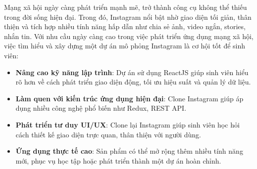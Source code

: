 

\vspace{0.5cm} %

Mạng xã hội ngày càng phát triển mạnh mẽ, trở thành công cụ không thể thiếu trong đời sống hiện đại. Trong đó, Instagram nổi bật nhờ giao diện tối giản, thân thiện và tích hợp nhiều tính năng hấp dẫn như chia sẻ ảnh, video ngắn, stories, nhắn tin. Với nhu cầu ngày càng cao trong việc phát triển ứng dụng mạng xã hội, việc tìm hiểu và xây dựng một dự án mô phỏng Instagram là cơ hội tốt để sinh viên:

\begin{itemize}
    \renewcommand{\labelitemi}{-} %
    \item \textbf{Nâng cao kỹ năng lập trình}: Dự án sử dụng ReactJS giúp sinh viên hiểu rõ hơn về cách phát triển giao diện động, tối ưu hiệu suất và quản lý dữ liệu.
    \item \textbf{Làm quen với kiến trúc ứng dụng hiện đại}: Clone Instagram giúp áp dụng nhiều công nghệ phổ biến như Redux, REST API.
    \item \textbf{Phát triển tư duy UI/UX}: Clone lại Instagram giúp sinh viên học hỏi cách thiết kế giao diện trực quan, thân thiện với người dùng.
    \item \textbf{Ứng dụng thực tế cao}: Sản phẩm có thể mở rộng thêm nhiều tính năng mới, phục vụ học tập hoặc phát triển thành một dự án hoàn chỉnh.
\end{itemize}
